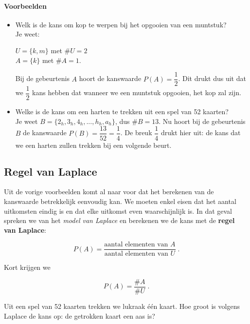 \documentclass[12pt,twoside]{article}
\begin{document}
\paragraph*{Voorbeelden}

\begin{itemize}
  \item Welk is de kans om kop te werpen bij het opgooien van een muntstuk?\\
  Je weet:
  \begin{minipage}[t]{\textwidth}
    $U =\{k, m\}$ met $\#U = 2$\\
    $A = \{k\}$ met $\#A = 1$.
  \end{minipage}
  Bij de gebeurtenis $A$ hoort de kanswaarde $P(A) =\dfrac{1}{2}$. Dit drukt dus uit dat we $\dfrac{1}{2}$ kans hebben dat wanneer we een muntstuk opgooien, het kop zal zijn.
  \item Welke is de kans om een harten te trekken uit een spel van 52 kaarten?\\
  Je weet $B = \{2_h , 3_h , 4_h , ..., h_h , a_h\}$, dus $\#B=13$.
  Nu hoort bij de gebeurtenis $B$ de kanswaarde $P(B)=\dfrac{13}{52}=\dfrac{1}{4}$. De breuk $\dfrac{1}{4}$ drukt hier uit: de kans dat we een harten zullen trekken bij een volgende beurt.
\end{itemize}

\subsection{Regel van Laplace}

Uit de vorige voorbeelden komt al naar voor dat het berekenen van de kanswaarde betrekkelijk eenvoudig kan. We moeten enkel eisen dat het aantal uitkomsten eindig is en dat elke uitkomst even waarschijnlijk is. In dat geval spreken we van het {\em model van Laplace} en berekenen we de kans met de {\bf regel van Laplace}:

$$P(A)=\dfrac{\mbox{aantal elementen van }A}{\mbox{aantal elementen van }U}\;.$$

Kort krijgen we\\
\begin{mdframed}
$$P(A)=\dfrac{\#A}{\#U}\;.$$
\end{mdframed}

\begin{oefening}
Uit een spel van 52 kaarten trekken we lukraak één kaart. Hoe groot is volgens Laplace de kans op: de getrokken kaart een aas is?
\end{oefening}
\end{document}
